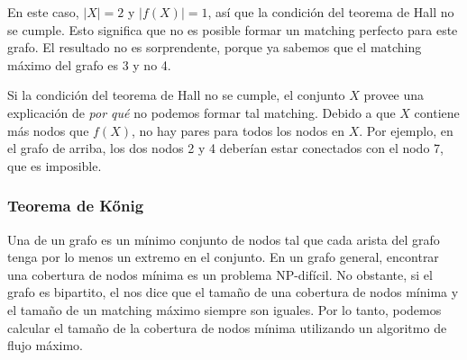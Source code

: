 En este caso, $|X|=2$ y $|f(X)|=1$, así que la condición del teorema
de Hall no se cumple. Esto significa que no es posible formar un
matching perfecto para este grafo. El resultado no es sorprendente,
porque ya sabemos que el matching máximo del grafo es 3 y no 4.

Si la condición del teorema de Hall no se cumple, el conjunto $X$
provee una explicación de \emph{por qué} no podemos formar tal matching.
Debido a que $X$ contiene más nodos que $f(X)$, no hay pares para todos
los nodos en $X$. Por ejemplo, en el grafo de arriba, los dos nodos 2 y
4 deberían estar conectados con el nodo 7, que es imposible.

\subsubsection{Teorema de Kőnig}


Una  de un grafo es un mínimo conjunto
de nodos tal que cada arista del grafo tenga por lo menos un extremo
en el conjunto. En un grafo general, encontrar una cobertura de nodos
mínima es un problema NP-difícil. No obstante, si el grafo es bipartito,
el  nos dice que el tamaño de una cobertura de
nodos mínima y el tamaño de un matching máximo siempre son iguales.
Por lo tanto, podemos calcular el tamaño de la cobertura de nodos mínima
utilizando un algoritmo de flujo máximo.

